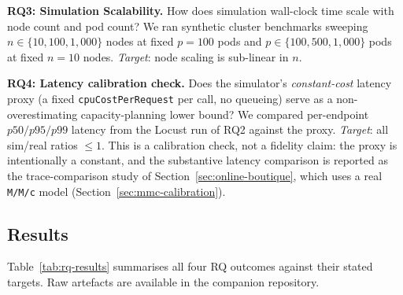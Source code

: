 \documentclass[ASNA,twocolumn]{USG}
\begin{document}
    \textbf{RQ3: Simulation Scalability.} How does simulation wall-clock
    time scale with node count and pod count? We ran synthetic cluster
    benchmarks sweeping $n \in \{10, 100, 1{,}000\}$ nodes at fixed
    $p = 100$ pods and $p \in \{100, 500, 1{,}000\}$ pods at fixed
    $n = 10$ nodes.
    \emph{Target}: node scaling is sub-linear in $n$.

    \textbf{RQ4: Latency calibration check.} Does the simulator's
    \emph{constant-cost} latency proxy (a fixed
    \texttt{cpuCostPerRequest} per call, no queueing) serve as a
    non-overestimating capacity-planning lower bound? We compared
    per-endpoint $p50/p95/p99$ latency from the Locust run of RQ2 against
    the proxy. \emph{Target}: all sim/real ratios $\leq 1$. This is a
    calibration check, not a fidelity claim: the proxy is intentionally a
    constant, and the substantive latency comparison is reported as the
    trace-comparison study of Section~\ref{sec:online-boutique}, which
    uses a real \texttt{M/M/c} model (Section~\ref{sec:mmc-calibration}).

    \subsection{Results}\label{sec:results}

    Table~\ref{tab:rq-results} summarises all four RQ outcomes against
    their stated targets. Raw artefacts are available in the companion repository.
\end{document}
